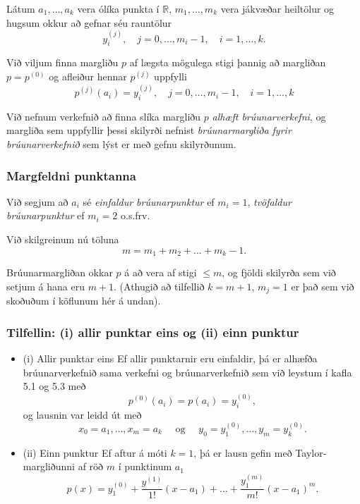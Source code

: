 \documentclass[icelandic,a4paper,12pt]{article}
\newcommand{\R}{{\mathbb  R}}
\begin{document}
Látum $a_1, \ldots, a_k$ vera ólíka punkta í $\R$, 
$m_1, \ldots, m_k$ vera jákvæðar heiltölur og hugsum okkur að gefnar 
séu rauntölur
\begin{equation*}
  y_i^{(j)}, \quad j = 0, \ldots, m_i-1, \quad i = 1, \ldots, k.
\end{equation*}

\pause
Við viljum finna margliðu $p$ af lægsta mögulega stigi þannig að
margliðan $p=p^{(0)}$ og afleiður hennar $p^{(j)}$ uppfylli
\begin{equation*}
  p^{(j)}(a_i) = y_i^{(j)}, 
  \quad j = 0, \ldots, m_i-1, \quad i = 1, \ldots, k
\end{equation*}

\pause
\smallskip
Við nefnum verkefnið að finna slíka margliðu $p$ 
{\em alhæft brúunarverkefni}, og margliða sem uppfyllir 
þessi skilyrði nefnist
{ \em brúunarmargliða fyrir brúunarverkefnið}
sem lýst er með gefnu skilyrðunum.  


\subsubsection{Margfeldni punktanna} 
Við segjum að $a_i$ sé \emph{einfaldur
brúunarpunktur} ef $m_i=1$, \emph{tvöfaldur brúunarpunktur}
ef $m_i=2$ o.s.frv.  

\pause
Við skilgreinum nú töluna 
\begin{equation*}
  m = m_1 + m_2 + \ldots + m_k - 1.
\end{equation*}

\pause
Brúunarmargliðan okkar $p$ á að vera af stigi $\leq m$, og 
fjöldi skilyrða sem við setjum á hana eru $m+1$. \pause
(Athugið að tilfellið $k=m+1$, $m_j=1$ er það sem við skoðuðum í 
köflunum hér á undan).

%
%
\subsubsection{Tilfellin: (i) allir punktar eins og  (ii)  einn punktur} 
\begin{itemize}
\item (i) Allir punktar eins
Ef allir punktarnir eru einfaldir, þá er 
alhæfða  brúunarverkefnið sama verkefni og
brúunarverkefnið sem við leystum í kafla 5.1 og 5.3
með
$$p^{(0)}(a_i) = p(a_i) = y_i^{(0)},
$$ 
og lausnin var leidd  út  með 
$$
x_0=a_1,\dots,x_m=a_k \quad \text{ og } \quad
y_0=y_1^{(0)},\dots,y_m=y_k^{(0)}.
$$

\pause
\item (ii) Einn punktur
Ef aftur á móti $k = 1$, þá er lausn gefin með Taylor-margliðunni
af röð $m$ í punktinum $a_1$
\begin{equation*}
  p(x) = y_1^{(0)} + \frac{y^{(1)}}{1!}(x - a_1) + 
  \ldots + \frac{y_1^{(m)}}{m!}(x - a_1)^m.
\end{equation*}

\end{itemize}
\end{document}
